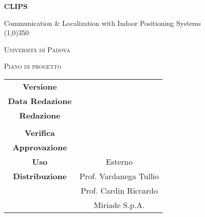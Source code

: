 \documentclass[a4paper,12pt]{article}
\author{Eduard Bicego, Federico Tavella, Andrea Tombolato}
\date{20/01/2016}
\begin{document}
	\begin{titlepage}
		\centering
		{\huge\bfseries CLIPS\par}
		Communication \& Localization with Indoor Positioning Systems \\
		\line(1,0){350} \\
		{\scshape\LARGE Università di Padova \par}
		\vspace{1cm}
		{\scshape\Large Piano di progetto\par}
		\logo
	
		\vfill \vfill
		\begin{tabular}{c|c}
			{\hfill \textbf{Versione}} 			&			\\
			{\hfill\textbf{Data Redazione}} 	& 	\\
			{\hfill\textbf{Redazione}} 			&   \\ 
												& 	\\
			{\hfill\textbf{Verifica}} 			&  	\\
			{\hfill\textbf{Approvazione}} 		& 	\\
			{\hfill\textbf{Uso}} 				& Esterno			\\
			{\hfill\textbf{Distribuzione}} 		& Prof. Vardanega Tullio \\
												& Prof. Cardin Riccardo \\
												& Miriade S.p.A. \\
	\end{tabular}
\end{titlepage}

	\pagestyle{myfront}	
	
	\newpage
			
	\newpage
		\tableofcontents 	%
	\newpage
		\listoftables 		%
	\newpage	
		\listoffigures		%
	
	\label{LastFrontPage}

	\newpage
		\pagestyle{mymain}
	
	\newpage
		
	\newpage
		

	\newpage
		
		
	\newpage
		
		
	\newpage
			
		
	\newpage
			

    \newpage
		
		
	\newpage
		
        		
	\label{LastPage}
\end{document}
